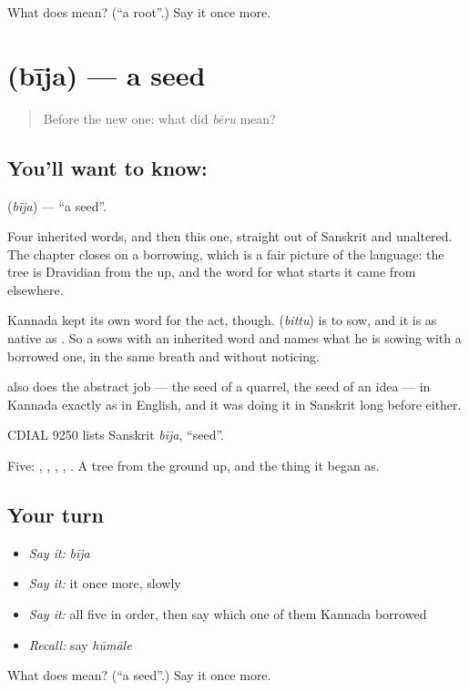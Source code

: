 \begin{tcolorbox}[breakable,colback=teal!4,colframe=teal!35!black,title={Before you move on}]
What does  mean? (\textquotedblleft{}a root\textquotedblright{}.) Say it once more.
\end{tcolorbox}
\section[\texorpdfstring{\kn{ಬೀಜ} (bīja)}{ಬೀಜ (bīja)}]{ (bīja) — a seed}

\label{lesson:KA-C54-seed}



\begin{quote}
Before the new one: what did \emph{bēru} mean?
\end{quote}

\subsection*{You'll want to know: }
\textbf{} (\emph{bīja}) — \textquotedblleft{}a seed\textquotedblright{}.

Four inherited words, and then this one, straight out of Sanskrit and unaltered. The chapter closes on a borrowing, which is a fair picture of the language: the tree is Dravidian from the  up, and the word for what starts it came from elsewhere.

Kannada kept its own word for the act, though.  (\emph{bittu}) is to sow, and it is as native as . So a  sows with an inherited word and names what he is sowing with a borrowed one, in the same breath and without noticing.

 also does the abstract job — the seed of a quarrel, the seed of an idea — in Kannada exactly as in English, and it was doing it in Sanskrit long before either.

CDIAL 9250 lists Sanskrit \emph{bīja}, \textquotedblleft{}seed\textquotedblright{}.

\begin{grammarlens}[title={What you've built}]
Five: , , , , . A tree from the ground up, and the thing it began as.
\end{grammarlens}

\subsection*{Your turn}
\begin{itemize}
\raggedright
  \item \emph{Say it:} \emph{bīja}
  \item \emph{Say it:} it once more, slowly
  \item \emph{Say it:} all five in order, then say which one of them Kannada borrowed
  \item \emph{Recall:} say \emph{hūmāle}
\end{itemize}

\begin{tcolorbox}[breakable,colback=teal!4,colframe=teal!35!black,title={Before you move on}]
What does  mean? (\textquotedblleft{}a seed\textquotedblright{}.) Say it once more.
\end{tcolorbox}
